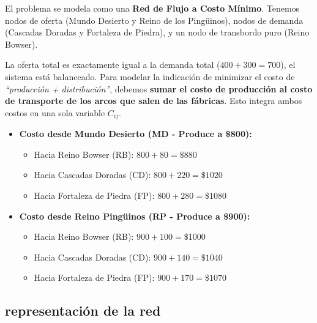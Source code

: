 \documentclass[10pt,a4paper]{article}
\begin{document}
El problema se modela como una \textbf{Red de Flujo a Costo Mínimo}. 
Tenemos nodos de oferta (Mundo Desierto y Reino de los Pingüinos), 
nodos de demanda (Cascadas Doradas y Fortaleza de Piedra), 
y un nodo de transbordo puro (Reino Bowser). 

La oferta total es exactamente igual a la demanda total 
($400 + 300 = 700$), el sistema está balanceado. 
Para modelar la indicación de minimizar el costo de 
\textit{``producción + distribución''}, debemos 
\textbf{sumar el costo de producción al costo de 
transporte de los arcos que salen de las fábricas}. 
Esto integra ambos costos en una sola variable $C_{ij}$.

\begin{itemize}
    \item \textbf{Costo desde Mundo Desierto (MD - Produce a \$800):}
    \begin{itemize}
        \item Hacia Reino Bowser (RB): $800 + 80 = \$880$
        \item Hacia Cascadas Doradas (CD): $800 + 220 = \$1020$
        \item Hacia Fortaleza de Piedra (FP): $800 + 280 = \$1080$
    \end{itemize}
    \item \textbf{Costo desde Reino Pingüinos (RP - Produce a \$900):}
    \begin{itemize}
        \item Hacia Reino Bowser (RB): $900 + 100 = \$1000$
        \item Hacia Cascadas Doradas (CD): $900 + 140 = \$1040$
        \item Hacia Fortaleza de Piedra (FP): $900 + 170 = \$1070$
    \end{itemize}
\end{itemize}

\subsection{representación de la red}
\end{document}
